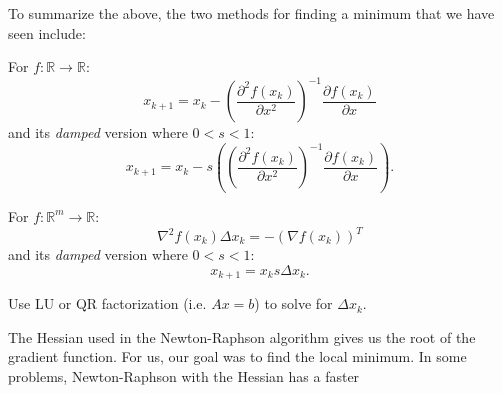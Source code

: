 To summarize the above, the two methods for finding a minimum that we have seen include:
\begin{definition}
  For \(f: \mathbb{R} \to \mathbb{R} \):
  \[
    x_{k+1} = x_k - \left(\frac{\partial^2 f(x_k)}{\partial x^2}\right)^{-1} \frac{\partial f(x_k)}{\partial x} 
  \]
  and its \emph{damped} version where \(0 < s < 1\):
  \[
    x_{k+1} = x_k - s(\left(\frac{\partial^2 f(x_k)}{\partial x^2}\right)^{-1} \frac{\partial f(x_k)}{\partial x}).
  \] 
\end{definition}
\begin{definition}
  For \(f: \mathbb{R} ^m \to \mathbb{R} \):
  \[
    \nabla^2 f(x_k) \Delta x_k = -(\nabla f(x_k))^T
  \]
  and its \emph{damped} version where \(0 < s < 1\):
  \[
    x_{k+1} = x_k s \Delta x_k.
  \]
\end{definition}
\begin{remark}
  Use LU or QR factorization (i.e. \(Ax=b\)) to solve for \(\Delta x_k\).
\end{remark}

The Hessian used in the Newton-Raphson algorithm gives us the root of the gradient function. For us, our goal was to find the local minimum. In some problems, Newton-Raphson with the Hessian has a faster 